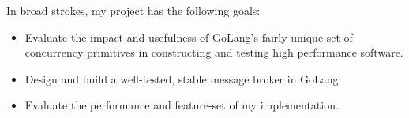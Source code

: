 In broad strokes, my project has the following goals:

 \begin{itemize}
   \item Evaluate the impact and usefulness of GoLang's fairly unique set of
   concurrency primitives in constructing and testing high performance software.
   \item Design and build a well-tested, stable message broker in GoLang.
   \item Evaluate the performance and feature-set of my implementation.
 \end{itemize}
